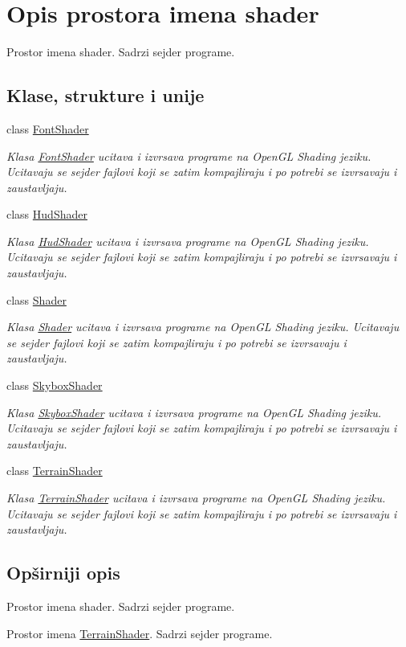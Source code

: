 \hypertarget{namespaceshader}{}\section{Opis prostora imena shader}
\label{namespaceshader}


Prostor imena shader. Sadrzi sejder programe.  


\subsection*{Klase, strukture i unije}
\begin{DoxyCompactItemize}
\item 
class \hyperlink{classshader_1_1FontShader}{Font\+Shader}
\begin{DoxyCompactList}\small\item\em Klasa \hyperlink{classshader_1_1FontShader}{Font\+Shader} ucitava i izvrsava programe na Open\+GL Shading jeziku. Ucitavaju se sejder fajlovi koji se zatim kompajliraju i po potrebi se izvrsavaju i zaustavljaju. \end{DoxyCompactList}\item 
class \hyperlink{classshader_1_1HudShader}{Hud\+Shader}
\begin{DoxyCompactList}\small\item\em Klasa \hyperlink{classshader_1_1HudShader}{Hud\+Shader} ucitava i izvrsava programe na Open\+GL Shading jeziku. Ucitavaju se sejder fajlovi koji se zatim kompajliraju i po potrebi se izvrsavaju i zaustavljaju. \end{DoxyCompactList}\item 
class \hyperlink{classshader_1_1Shader}{Shader}
\begin{DoxyCompactList}\small\item\em Klasa \hyperlink{classshader_1_1Shader}{Shader} ucitava i izvrsava programe na Open\+GL Shading jeziku. Ucitavaju se sejder fajlovi koji se zatim kompajliraju i po potrebi se izvrsavaju i zaustavljaju. \end{DoxyCompactList}\item 
class \hyperlink{classshader_1_1SkyboxShader}{Skybox\+Shader}
\begin{DoxyCompactList}\small\item\em Klasa \hyperlink{classshader_1_1SkyboxShader}{Skybox\+Shader} ucitava i izvrsava programe na Open\+GL Shading jeziku. Ucitavaju se sejder fajlovi koji se zatim kompajliraju i po potrebi se izvrsavaju i zaustavljaju. \end{DoxyCompactList}\item 
class \hyperlink{classshader_1_1TerrainShader}{Terrain\+Shader}
\begin{DoxyCompactList}\small\item\em Klasa \hyperlink{classshader_1_1TerrainShader}{Terrain\+Shader} ucitava i izvrsava programe na Open\+GL Shading jeziku. Ucitavaju se sejder fajlovi koji se zatim kompajliraju i po potrebi se izvrsavaju i zaustavljaju. \end{DoxyCompactList}\end{DoxyCompactItemize}


\subsection{Opširniji opis}
Prostor imena shader. Sadrzi sejder programe. 

Prostor imena \hyperlink{classshader_1_1TerrainShader}{Terrain\+Shader}. Sadrzi sejder programe. 